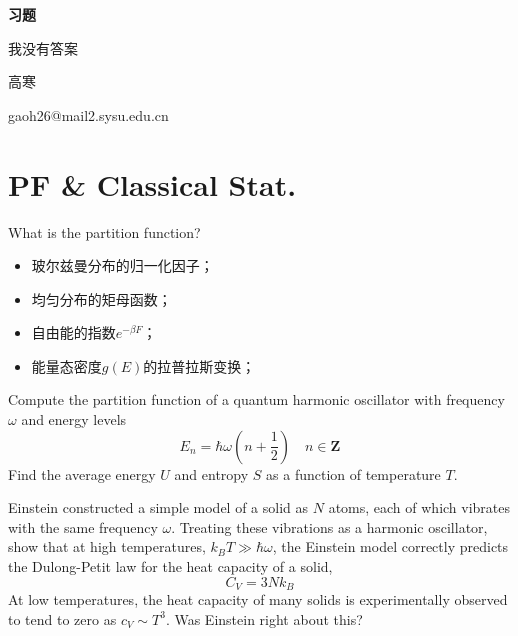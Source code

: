 \documentclass[CJK]{beamer}
\author{}
\date{}
\begin{document}
\begin{frame}
 
\begin{center}
\bch
\begin{Large}
{\bf \LARGE 习题}

\skipline
{\small 我没有答案}


\end{Large}
\skipline

高寒   


gaoh26@mail2.sysu.edu.cn 

\ech
\end{center}
\end{frame}


\section{PF \& Classical Stat.}

\begin{frame}
\bch
What is the partition function?
\begin{itemize}
\item 玻尔兹曼分布的归一化因子；
\item 均匀分布的矩母函数；
\item 自由能的指数$e^{-\beta F}$；
\item 能量态密度$g(E)$的拉普拉斯变换；
\end{itemize}
\ech
\end{frame}


\begin{frame}
\bch
Compute the partition function of a quantum harmonic oscillator with frequency $\omega$
and energy levels$$E_{n}=\hbar \omega\left(n+\frac{1}{2}\right) \quad n \in \mathbf{Z}$$
Find the average energy $U$ and entropy $S$ as a function of temperature $T$.\par

\ech
\end{frame}

\begin{frame}
\bch
Einstein constructed a simple model of a solid as $N$ atoms, each of which vibrates with
the same frequency $\omega$. Treating these vibrations as a harmonic oscillator, show that at
high temperatures, $k_B T \gg \hbar \omega$, the Einstein model correctly predicts the Dulong-Petit
law for the heat capacity of a solid, $$C_V = 3Nk_B$$ At low temperatures, the heat capacity of many solids is experimentally observed to
tend to zero as $c_V \sim T^3$. Was Einstein right about this?
\ech
\end{frame}
\end{document}
